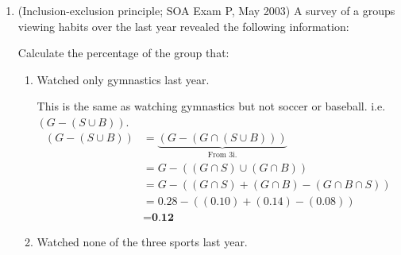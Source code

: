 \documentclass[11pt]{article}
\begin{document}
\begin{enumerate}
		\item (Inclusion-exclusion principle; SOA Exam P, May 2003) A survey of a groups viewing habits over the last year revealed the following information:
			Calculate the percentage of the group that:
				\begin{enumerate}
					\item Watched only gymnastics last year.
						\begin{mdframed}
							This is the same as watching gymnastics but not soccer or baseball. i.e. $ (G - (S \cup B)) $.
							\begin{align*}
								\left(G - \left(S \cup B\right)\right) &= \underbrace{\left(G - \left(G \cap \left(S \cup B\right) \right) \right)}_{\text{From 3i.}}\\
								&= G - \left( \left(G \cap S \right) \cup \left(G \cap B \right)   \right)\\
								&= G - \left( \left(G \cap S \right) + \left(G \cap B \right)  - \left(G \cap B \cap S \right) \right)\\
								&= 0.28 - \left( \left(0.10\right) + \left(0.14\right)  - \left(0.08\right) \right)\\
								&= \textbf{0.12}
							\end{align*}
						\end{mdframed}
					\item Watched none of the three sports last year.
						\begin{mdframed}

\end{mdframed}
\end{enumerate}
\end{enumerate}
\end{document}
